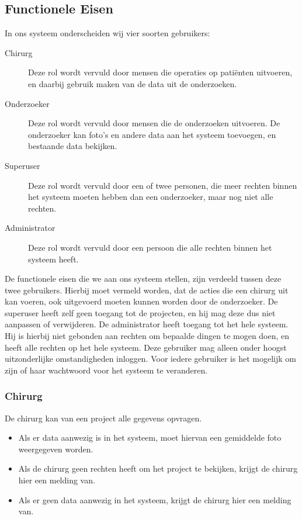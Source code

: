 \subsection{Functionele Eisen}
\label{functionele_eisen}
In ons systeem onderscheiden wij vier soorten gebruikers:
\begin{description}
	\item[Chirurg] Deze rol wordt vervuld door mensen die operaties op pati\"enten uitvoeren, en daarbij gebruik maken van de data uit de onderzoeken.
	\item[Onderzoeker] Deze rol wordt vervuld door mensen die de onderzoeken uitvoeren. De onderzoeker kan foto's en andere data aan het systeem toevoegen, en bestaande data bekijken.	
	\item[Superuser] Deze rol wordt vervuld door een of twee personen, die meer rechten binnen het systeem moeten hebben dan een onderzoeker, maar nog niet alle rechten.
	\item[Administrator] Deze rol wordt vervuld door een persoon die alle rechten binnen het systeem heeft.
\end{description}
De functionele eisen die we aan ons systeem stellen, zijn verdeeld tussen deze twee gebruikers. Hierbij moet vermeld worden, dat de acties die een chirurg uit kan voeren, ook uitgevoerd moeten kunnen worden door de onderzoeker.
De superuser heeft zelf geen toegang tot de projecten, en hij mag deze dus niet aanpassen of verwijderen.
De administrator heeft toegang tot het hele systeem. 
Hij is hierbij niet gebonden aan rechten om bepaalde dingen te mogen doen, en heeft alle rechten op het hele systeem. 
Deze gebruiker mag alleen onder hoogst uitzonderlijke omstandigheden inloggen.
Voor iedere gebruiker is het mogelijk om zijn of haar wachtwoord voor het systeem te veranderen.
\subsubsection{Chirurg}

De chirurg kan van een project alle gegevens opvragen.
\begin{itemize}
	\item Als er data aanwezig is in het systeem, moet hiervan een gemiddelde foto weergegeven worden. 
	\item Als de chirurg geen rechten heeft om het project te bekijken, krijgt de chirurg hier een melding van.
	\item Als er geen data aanwezig in het systeem, krijgt de chirurg hier een melding van. 
\end{itemize}

